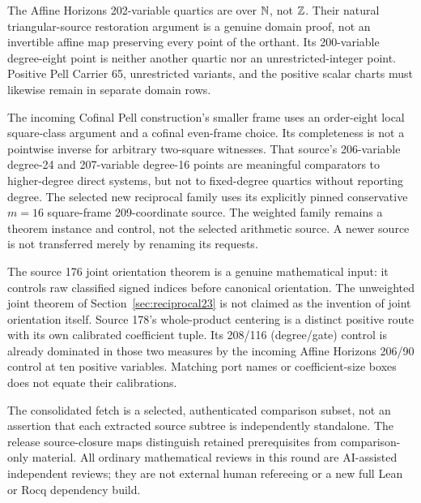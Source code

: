 The Affine Horizons 202-variable quartics are over $\mathbb N$, not $\mathbb Z$.
Their natural triangular-source restoration argument is a genuine domain
proof, not an invertible affine map preserving every point of the orthant.
Its 200-variable degree-eight point is neither another quartic nor an
unrestricted-integer point. Positive Pell Carrier 65, unrestricted variants,
and the positive scalar charts must likewise remain in separate domain rows.

The incoming Cofinal Pell construction's smaller frame uses an order-eight
local square-class argument and a cofinal even-frame choice. Its completeness
is not a pointwise inverse for arbitrary two-square witnesses. That source's
206-variable degree-24 and 207-variable degree-16 points are meaningful
comparators to higher-degree direct systems, but not to fixed-degree quartics
without reporting degree. The selected new reciprocal family uses its explicitly pinned conservative
$m=16$ square-frame 209-coordinate source. The weighted family remains a
theorem instance and control, not the selected arithmetic source. A newer
source is not transferred merely by renaming its requests.

The source 176 joint orientation theorem is a genuine mathematical input:
it controls raw classified signed indices before canonical orientation.
The unweighted joint theorem of Section~\ref{sec:reciprocal23} is not claimed as the invention of
joint orientation itself. Source 178's whole-product centering is a distinct
positive route with its own calibrated coefficient tuple. Its 208/116
(degree/gate) control is already dominated in those two measures by the
incoming Affine Horizons 206/90 control at ten positive variables. Matching
port names or coefficient-size boxes does not equate their calibrations.

The consolidated fetch is a selected, authenticated comparison subset, not
an assertion that each extracted source subtree is independently standalone.
The release source-closure maps distinguish retained prerequisites from
comparison-only material. All ordinary mathematical reviews in this round
are AI-assisted independent reviews; they are not external human refereeing
or a new full Lean or Rocq dependency build.
